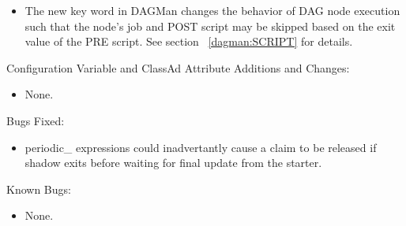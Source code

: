 \begin{itemize}


\item The new  key word in DAGMan changes the
behavior of DAG node execution such that the node's job and POST script
may be skipped based on the exit value of the PRE script.
See section ~\ref{dagman:SCRIPT} for details.


\end{itemize}

\noindent Configuration Variable and ClassAd Attribute Additions and Changes:

\begin{itemize}

\item None.

\end{itemize}

\noindent Bugs Fixed:

\begin{itemize}

\item periodic_ expressions could inadvertantly cause a claim
to be released if shadow exits before waiting for final update 
from the starter. 

\end{itemize}

\noindent Known Bugs:

\begin{itemize}

\item None.

\end{itemize}

